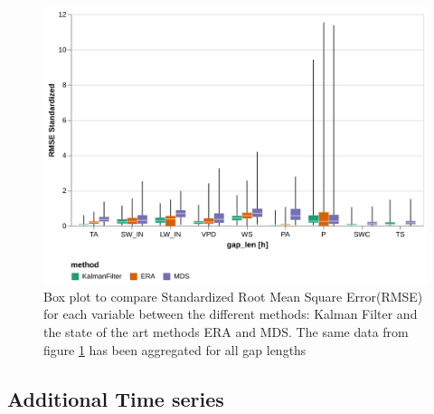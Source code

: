 \documentclass{article}
\newcommand{\imgwidth}{6in}
\let\Oldsubsection\subsection
\renewcommand{\subsection}{\FloatBarrier\Oldsubsection}
\begin{document}
\begin{figure}
    \centerline{\includegraphics[width=\imgwidth]{the_plot_stand}}
\caption{Box plot to compare Standardized Root Mean Square Error(RMSE) for each variable between the different methods: Kalman Filter and the state of the art methods ERA and MDS. The same data from figure \ref{fig:the_plot} has been aggregated for all gap lengths}
\label{fig:the_plot}
\end{figure}



\subsection{Additional Time series}
\end{document}
